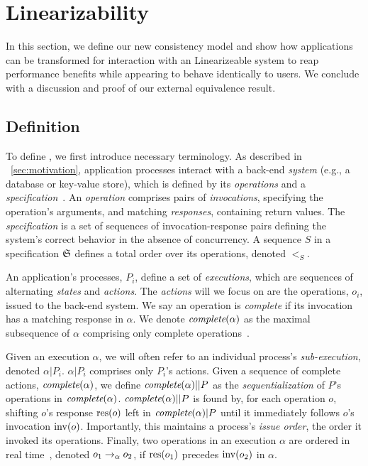 \section{\Multidispatch{} Linearizability}
\label{sec:mdl}

In this section, we define our new consistency model and show how
applications can be transformed for interaction with an \multidispatch{} Linearizeable system to reap performance benefits while appearing to behave identically to users. We conclude with a discussion and proof of our external equivalence result.



\subsection{Definition}
\label{sec:mdl:def}


To define \mdl{}, we first introduce necessary terminology. As described in ~\ref{sec:motivation}, application processes interact with a back-end \textit{system} (e.g., a database or key-value store),
which is defined by its \textit{operations} and a
\textit{specification}~\cite{herlihy1990linearizability,lynch1996da}. An
\textit{operation} comprises pairs of \textit{invocations}, specifying the
operation's arguments, and matching \textit{responses}, containing
return values. The \textit{specification} is a
set of sequences of
invocation-response pairs defining the system's correct behavior in the absence
of concurrency. A sequence $S$ in a specification $\mathfrak{S}$ defines a total order
over its operations, denoted $<_S$.

An application's processes, $P_i$, define a set of \textit{executions},
which are sequences of alternating \textit{states} and
\textit{actions}. The \textit{actions} will we focus on are the operations, $o_i$, issued to the back-end system.
We say an
operation is \textit{complete} if its invocation has a matching response in
$\alpha$. We denote $\operatorname*{\textit{complete}}(\alpha)$ as the maximal subsequence of $\alpha$
comprising only complete operations~\cite{herlihy1990linearizability}. 

Given an execution $\alpha$, we will often refer to an individual process's
\textit{sub-execution}, denoted $\alpha|P_i$. $\alpha|P_i$ comprises
only $P_i$'s actions. Given a sequence of complete actions,
$\operatorname*{\textit{complete}}(\alpha)$, we define $\operatorname*{\textit{complete}}(\alpha)||P$ as the
\textit{sequentialization} of $P$'s operations in $\operatorname*{\textit{complete}}(\alpha)$.
$\operatorname*{\textit{complete}}(\alpha)||P$ is found by, for each operation $o$, shifting $o$'s response
$\operatorname{res}(o)$ left in $\operatorname*{\textit{complete}}(\alpha)|P$ until it immediately follows $o$'s
invocation $\operatorname{inv}(o)$.
Importantly, this maintains a process's
\textit{issue order}, the order it invoked its operations. 
Finally, two operations in an execution $\alpha$ are
ordered in real time~\cite{herlihy1990linearizability}, denoted
$o_1 \rightarrow_\alpha o_2$, if $\operatorname{res}(o_1)$ precedes $\operatorname{inv}(o_2)$ in $\alpha$. 

